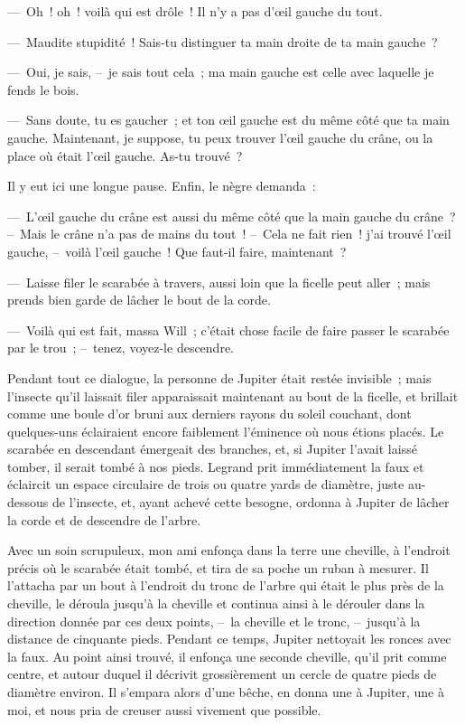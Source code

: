 \documentclass[french,twoside]{book} %
\begin{document}
— Oh ! oh ! voilà qui est drôle ! Il n’y a pas d’œil gauche du tout.\par
— Maudite stupidité ! Sais-tu distinguer ta main droite de ta main gauche ?\par
— Oui, je sais, – je sais tout cela ; ma main gauche est celle avec laquelle je fends le bois.\par
— Sans doute, tu es gaucher ; et ton œil gauche est du même côté que ta main gauche. Maintenant, je suppose, tu peux trouver l’œil gauche du crâne, ou la place où était l’œil gauche. As-tu trouvé ?\par
Il y eut ici une longue pause. Enfin, le nègre demanda :\par
— L’œil gauche du crâne est aussi du même côté que la main gauche du crâne ? – Mais le crâne n’a pas de mains du tout ! – Cela ne fait rien ! j’ai trouvé l’œil gauche, – voilà l’œil gauche ! Que faut-il faire, maintenant ?\par
— Laisse filer le scarabée à travers, aussi loin que la ficelle peut aller ; mais prends bien garde de lâcher le bout de la corde.\par
— Voilà qui est fait, massa Will ; c’était chose facile de faire passer le scarabée par le trou ; – tenez, voyez-le descendre.\par
Pendant tout ce dialogue, la personne de Jupiter était restée invisible ; mais l’insecte qu’il laissait filer apparaissait maintenant au bout de la ficelle, et brillait comme une boule d’or bruni aux derniers rayons du soleil couchant, dont quelques-uns éclairaient encore faiblement l’éminence où nous étions placés. Le scarabée en descendant émergeait des branches, et, si Jupiter l’avait laissé tomber, il serait tombé à nos pieds. Legrand prit immédiatement la faux et éclaircit un espace circulaire de trois ou quatre yards de diamètre, juste au-dessous de l’insecte, et, ayant achevé cette besogne, ordonna à Jupiter de lâcher la corde et de descendre de l’arbre.\par
Avec un soin scrupuleux, mon ami enfonça dans la terre une cheville, à l’endroit précis où le scarabée était tombé, et tira de sa poche un ruban à mesurer. Il l’attacha par un bout à l’endroit du tronc de l’arbre qui était le plus près de la cheville, le déroula jusqu’à la cheville et continua ainsi à le dérouler dans la direction donnée par ces deux points, – la cheville et le tronc, – jusqu’à la distance de cinquante pieds. Pendant ce temps, Jupiter nettoyait les ronces avec la faux. Au point ainsi trouvé, il enfonça une seconde cheville, qu’il prit comme centre, et autour duquel il décrivit grossièrement un cercle de quatre pieds de diamètre environ. Il s’empara alors d’une bêche, en donna une à Jupiter, une à moi, et nous pria de creuser aussi vivement que possible.\par
\end{document}

